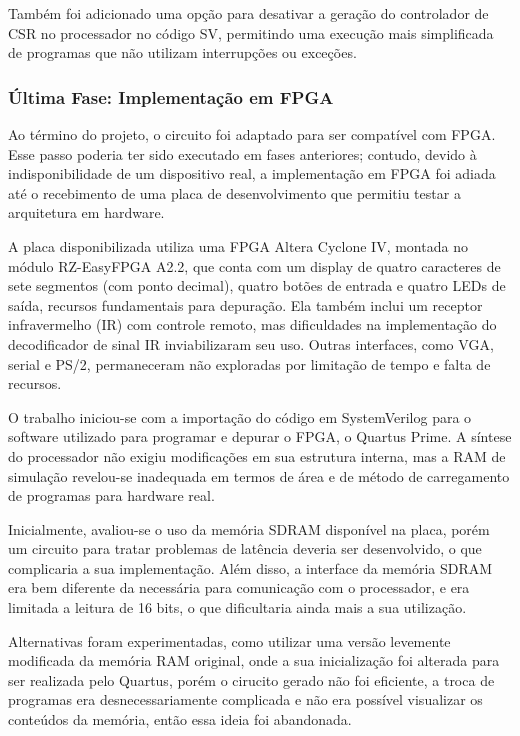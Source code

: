 \documentclass[
	12pt,				%
	openright,			%
	oneside,			%
	a4paper,			%
	english,			%
	french,				%
	spanish,			%
	brazil,				%
	]{abntex2}
\begin{document}
Também foi adicionado uma opção para desativar a geração do controlador de CSR no processador no código SV, permitindo uma execução mais simplificada de programas que não utilizam interrupções ou exceções.

\subsubsection{Última Fase: Implementação em FPGA}\label{subsubsec:fpga}

Ao término do projeto, o circuito foi adaptado para ser compatível com FPGA. Esse passo poderia ter sido executado em fases anteriores; contudo, devido à indisponibilidade de um dispositivo real, a implementação em FPGA foi adiada até o recebimento de uma placa de desenvolvimento que permitiu testar a arquitetura em hardware.

A placa disponibilizada utiliza uma FPGA Altera Cyclone IV, montada no módulo RZ-EasyFPGA A2.2, que conta com um display de quatro caracteres de sete segmentos (com ponto decimal), quatro botões de entrada e quatro LEDs de saída, recursos fundamentais para depuração. Ela também inclui um receptor infravermelho (IR) com controle remoto, mas dificuldades na implementação do decodificador de sinal IR inviabilizaram seu uso. Outras interfaces, como VGA, serial e PS/2, permaneceram não exploradas por limitação de tempo e falta de recursos.

O trabalho iniciou-se com a importação do código em SystemVerilog para o software utilizado para programar e depurar o FPGA, o Quartus Prime. A síntese do processador não exigiu modificações em sua estrutura interna, mas a RAM de simulação revelou-se inadequada em termos de área e de método de carregamento de programas para hardware real.

Inicialmente, avaliou-se o uso da memória SDRAM disponível na placa, porém um circuito para tratar problemas de latência deveria ser desenvolvido, o que complicaria a sua implementação. Além disso, a interface da memória SDRAM era bem diferente da necessária para comunicação com o processador, e era limitada a leitura de 16 bits, o que dificultaria ainda mais a sua utilização.

Alternativas foram experimentadas, como utilizar uma versão levemente modificada da memória RAM original, onde a sua inicialização foi alterada para ser realizada pelo Quartus, porém o cirucito gerado não foi eficiente, a troca de programas era desnecessariamente complicada e não era possível visualizar os conteúdos da memória, então essa ideia foi abandonada.
\end{document}
